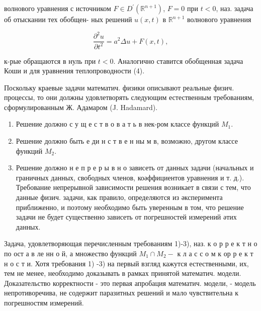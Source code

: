 \documentclass[10pt]{article}
\begin{document}
волнового уравнения с источником $F \in D^{\prime}\left(\mathbb{R}^{n+1}\right)$, $F=0$ при $t<0$, наз. задача об отыскании тех обобщен- ных решений $u(x, t)$ в $\mathbb{R}^{n+1}$ волнового уравнения



\[

\frac{\partial^{2} u}{\partial t^{2}}=a^{2} \Delta u+F(x, t),

\]



к-рые обращаются в нуль при $t<0$. Аналогично ставится обобщенная задача Коши и для уравнения теплопроводности (4).



Поскольку краевые задачи математич. физики описывают реальные физич. процессы, то они должны удовлетворять следующим естественным требованиям, сформулированным Ж. Адамаром (J. Hadamard).



\begin{enumerate}

  \item Решение должно с у щ е с т в о в а т ь в нек-ром классе функций $M_{1}$.



  \item Решение должно быть е ди н с т в е н ны м в, возможно, другом классе функций $M_{2}$.



  \item Решение должно н е п р е р ы в н о зависеть от данных задачи (начальных и граничных данных, свободных членов, коәффициентов уравнения и т. д.). Требование непрерывной зависимости решения возникает в связи с тем, что данные физич. задачи, как правило, определяются из әксперимента приближенно, и поэтому необходимо быть уверенным в том, что решение задачи не будет существенно зависеть от погрешностей измерений әтих данных.



\end{enumerate}



Задача, удовлетворяющая перечисленным требованиям 1)-3), наз. к о р р е к т н о по ост а в ле нн о й, а множество функций $M_{1} \cap M_{2}-$ к л а с с о м к ор р е к т н о с т и. Хотя требования 1) -3) на первый взгляд кажутся естественными, их, тем не менее, необходимо доказывать в рамках принятой математич. модели. Доказательство корректности - это первая апробация математич. модели, - модель непротиворечива, не содержит паразитных решений и мало чувствительна к погрешностям измерений.
\end{document}
